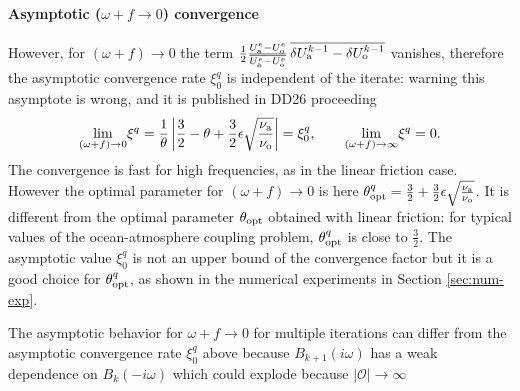 \paragraph{Asymptotic ($\omega+f \rightarrow 0$) convergence}

However, for $(\omega+f) \rightarrow 0$ the term 
$ \frac{1}{2}\frac{U_{\rm a}^e - U_{\rm o}^e}{\overline{U_{\rm a}^e - U_{\rm o}^e}}\,
\overline{
\delta U_{\rm a}^{k-1} - \delta U_{\rm o}^{k-1}}$
vanishes, therefore the asymptotic convergence 
rate $\xi_0^q$ is independent of the iterate:
{\color{red} warning this asymptote is wrong, and it is published
in DD26 proceeding}
\[
 \underset{(\omega+f) \rightarrow 0}{\mathrm{lim}} \xi^q = \frac{1}{\theta} \left| \frac{3}{2}-\theta+\frac{3}{2}\epsilon\sqrt{\frac{\nu_{\rm a}}{\nu_{\rm o}}} \right| = \xi_0^q, \qquad
 \underset{(\omega+f) \rightarrow \infty}{\mathrm{lim}} \xi^q = 0.
\]
The convergence is fast for high frequencies,
as in the linear friction case. However
the optimal parameter for $(\omega+f) \rightarrow 0$ is
here $\theta_{\rm opt}^q = \frac{3}{2} +
\frac{3}{2}\epsilon\sqrt{\frac{\nu_{\rm a}}{\nu_{\rm o}}}$.
It is different from the optimal parameter $\theta_{\rm opt}$
obtained with linear friction: for typical values of the
ocean-atmosphere coupling problem, $\theta_{\rm opt}^q$
is close to $\frac{3}{2}$.
The asymptotic value $\xi_0^q$ is not an upper bound of the
convergence factor but it is a good choice for $\theta_{\rm opt}^q$,
as shown in the numerical experiments in Section \ref{sec:num-exp}.
\par
The asymptotic behavior for $\omega+f \rightarrow 0$ for
multiple iterations can differ from the asymptotic convergence
rate $\xi_0^q$ above
because $B_{k+1}(i\omega)$ has a weak dependence on
$B_k(- i\omega)$ which could explode because
$|\mathcal{O}| \rightarrow \infty$


